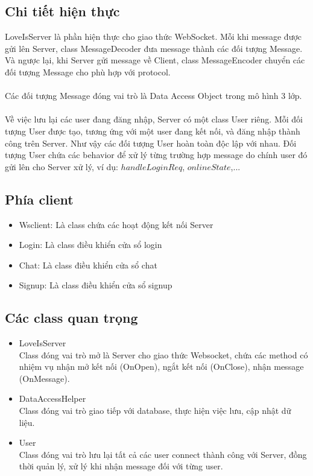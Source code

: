 \documentclass[10pt]{article}
\begin{document}
		\subsection{Chi tiết hiện thực}
				LoveIsServer là phần hiện thực cho giao thức WebSocket. Mỗi khi  message được gửi lên Server, class MessageDecoder đưa message thành các đối tượng Message. Và ngược lại, khi Server gửi message về Client, class MessageEncoder chuyển các đối tượng Message cho phù hợp với protocol.\\\\
				Các đối tượng Message đóng vai trò là Data Access Object trong mô hình 3 lớp.\\\\
				Về việc lưu lại các user đang đăng nhập, Server có một class User riêng. Mỗi đối tượng User được tạo, tương ứng với một user đang kết nối, và đăng nhập thành công trên Server. Như vậy các đối tượng User hoàn toàn độc lập với nhau. Đối tượng User chứa các behavior để xử lý từng trường hợp message do chính user đó gửi lên cho Server xử lý, ví dụ: $handleLoginReq$, $onlineState$,...\\
		\subsection{Phía client}
		\begin{itemize}
				\item Wsclient: Là class chứa các hoạt động kết nối Server
				\item Login: Là class điều khiển cửa sổ login
				\item Chat: Là class điều khiển cửa sổ chat
				\item Signup: Là class điều khiển cửa sổ signup
			\end{itemize}
		\subsection{Các class quan trọng}
			\begin{itemize}
				\item LoveIsServer\\
				Class đóng vai trò mở là Server cho giao thức Websocket, chứa các method có nhiệm vụ nhận mở kết nối (OnOpen), ngắt kết nối (OnClose), nhận message (OnMessage).
				\item DataAccessHelper\\
				Class đóng vai trò giao tiếp với database, thực hiện việc lưu, cập nhật dữ liệu.
				\item User\\
				Class đóng vai trò lưu lại tất cả các user connect thành công với Server, đồng thời quản lý, xử lý khi nhận message đối với từng user.
			\end{itemize}
\end{document}
